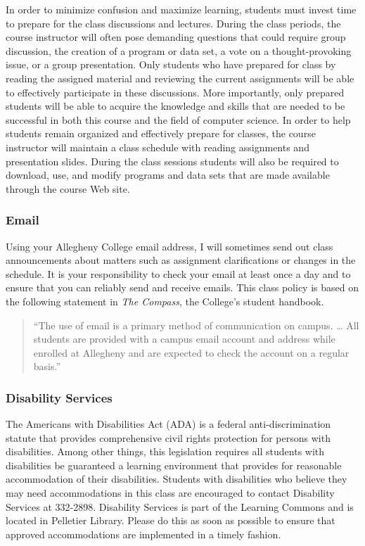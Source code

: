 In order to minimize confusion and maximize learning, students must invest time to prepare for the class discussions and
lectures.  During the class periods, the course instructor will often pose demanding questions that could require group
discussion, the creation of a program or data set, a vote on a thought-provoking issue, or a group presentation.  Only
students who have prepared for class by reading the assigned material and reviewing the current assignments will be able
to effectively participate in these discussions.  More importantly, only prepared students will be able to acquire the
knowledge and skills that are needed to be successful in both this course and the field of computer science.  In order
to help students remain organized and effectively prepare for classes, the course instructor will maintain a class
schedule with reading assignments and presentation slides.   During the class sessions students will also be required to
download, use, and modify programs and data sets that are made available through the course Web site.

\subsubsection*{Email}

Using your Allegheny College email address, I will sometimes send out class announcements about matters such as
assignment clarifications or changes in the schedule. It is your responsibility to check your email at least once a day
and to ensure that you can reliably send and receive emails. This class policy is based on the following statement in
{\em The Compass}, the College's student handbook.

\begin{quote}
``The use of email is a primary method of communication on campus. \ldots
All students are provided with a campus email account and address while
enrolled at Allegheny and are expected to check the account on a regular
basis.''
\end{quote}
\vspace*{-.15in}

\subsubsection*{Disability Services}

The Americans with Disabilities Act (ADA) is a federal anti-discrimination statute that provides comprehensive civil
rights protection for persons with disabilities.  Among other things, this legislation requires all students with
disabilities be guaranteed a learning environment that provides for reasonable accommodation of their disabilities.
Students with disabilities who believe they may need accommodations in this class are encouraged to contact Disability
Services at 332-2898.  Disability Services is part of the Learning Commons and is located in Pelletier Library.
Please do this as soon as possible to ensure that approved accommodations are implemented in a timely fashion.

